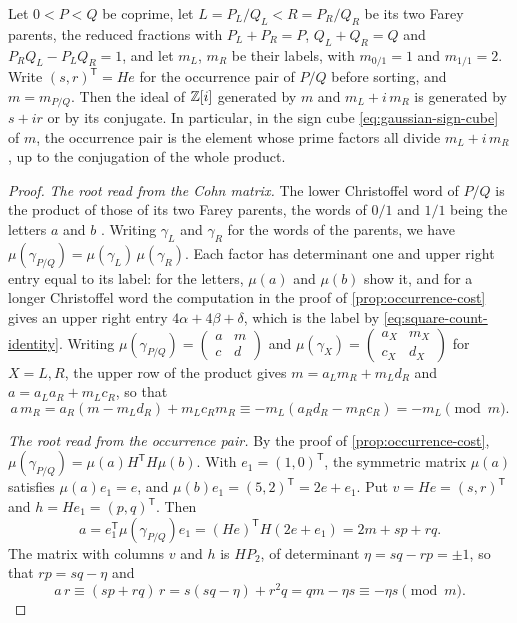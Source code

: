 \begin{proposition}\label{prop:occurrence-in-cube}
Let $0<P<Q$ be coprime, let $L=P_L/Q_L<R=P_R/Q_R$ be its two Farey
parents, the reduced fractions with $P_L+P_R=P$, $Q_L+Q_R=Q$ and
$P_RQ_L-P_LQ_R=1$, and let $m_L$, $m_R$ be their labels, with $m_{0/1}=1$ and
$m_{1/1}=2$. Write $(s,r)^{\mathsf T}=He$ for the
occurrence pair of $P/Q$ before sorting, and $m=m_{P/Q}$. Then the ideal of
$\mathbb{Z}[i]$ generated by $m$ and $m_L+i\,m_R$ is generated by $s+ir$ or by its
conjugate. In particular, in the sign cube \eqref{eq:gaussian-sign-cube} of
$m$, the occurrence pair is the element whose prime factors all divide
$m_L+i\,m_R$, up to the conjugation of the whole product.
\end{proposition}

\begin{proof}
\emph{The root read from the Cohn matrix.} The lower Christoffel word of
$P/Q$ is the product of those of its two Farey parents, the words of $0/1$
and $1/1$ being the letters $a$ and $b$ \cite{Reutenauer2009}. Writing
$\gamma_L$ and $\gamma_R$ for the words of the parents, we have
$\mu(\gamma_{P/Q})=\mu(\gamma_L)\,\mu(\gamma_R)$. Each factor has
determinant one and upper right entry equal to its label: for the letters,
$\mu(a)$ and $\mu(b)$ show it, and for a longer Christoffel word the
computation in the proof of \cref{prop:occurrence-cost} gives an upper right
entry $4\alpha+4\beta+\delta$, which is the label by
\eqref{eq:square-count-identity}. Writing
$\mu(\gamma_{P/Q})=\left(\begin{smallmatrix}a&m\\c&d\end{smallmatrix}\right)$ and
$\mu(\gamma_X)=\left(\begin{smallmatrix}a_X&m_X\\c_X&d_X\end{smallmatrix}\right)$
for $X=L,R$, the upper row of the product gives $m=a_Lm_R+m_Ld_R$ and
$a=a_La_R+m_Lc_R$, so that
$$
 a\,m_R=a_R(m-m_Ld_R)+m_Lc_Rm_R\equiv-m_L(a_Rd_R-m_Rc_R)=-m_L\pmod m .
$$

\emph{The root read from the occurrence pair.} By the proof of
\cref{prop:occurrence-cost}, $\mu(\gamma_{P/Q})=\mu(a)H^{\mathsf T}H\mu(b)$. With
$e_1=(1,0)^{\mathsf T}$, the symmetric matrix $\mu(a)$ satisfies $\mu(a)e_1=e$,
and $\mu(b)e_1=(5,2)^{\mathsf T}=2e+e_1$. Put $v=He=(s,r)^{\mathsf T}$ and
$h=He_1=(p,q)^{\mathsf T}$. Then
$$
 a=e_1^{\mathsf T}\mu(\gamma_{P/Q})e_1=(He)^{\mathsf T}H(2e+e_1)=2m+sp+rq .
$$
The matrix with columns $v$ and $h$ is $HP_2$, of determinant
$\eta=sq-rp=\pm1$, so that $rp=sq-\eta$ and
$$
 a\,r\equiv(sp+rq)\,r=s(sq-\eta)+r^2q=qm-\eta s\equiv-\eta s\pmod m .
$$


\end{proof}
